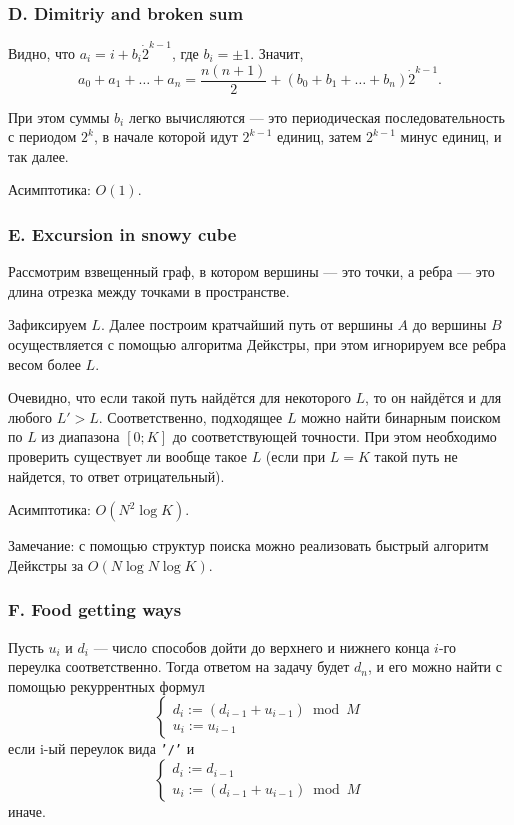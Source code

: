 \subsubsection*{D. Dimitriy and broken sum} 


Видно, что $a_i = i + b_i \dot 2^{k-1}$, где $b_i = \pm 1$. Значит,
$$ a_0 + a_1+ \dots + a_n = \frac{n(n + 1)}{2} + (b_0 + b_1 + \dots + b_n) \dot 2^{k-1}.$$

При этом суммы $b_i$ легко вычисляются --- это периодическая последовательность с периодом $2^k$, в начале которой идут $2^{k-1}$ единиц, затем $2^{k-1}$ минус единиц, и так далее.

Асимптотика: $O(1)$.



\subsubsection*{E. Excursion in snowy cube} 


Рассмотрим взвещенный граф, в котором вершины --- это точки, а ребра --- это длина отрезка между точками в
пространстве.

Зафиксируем $L$. Далее построим кратчайший путь от вершины $A$ до вершины $B$ осуществляется с помощью алгоритма Дейкстры, при этом игнорируем все ребра весом более $L$. 

Очевидно, что если такой путь найдётся для
некоторого $L$, то он найдётся и для любого $L' > L$. Соответственно, подходящее $L$ можно найти бинарным поиском по $L$ из диапазона $[0; K]$ до соответствующей точности. При этом необходимо проверить существует ли вообще такое $L$ (если при $L = K$ такой путь не найдется, то ответ отрицательный).

Асимптотика: $O(N^2 \log{K})$.

Замечание: с помощью структур поиска можно реализовать быстрый алгоритм Дейкстры за $O(N \log{N} \log{K})$.



\subsubsection*{F. Food getting ways} 


Пусть $u_i$ и $d_i$ --- число способов дойти
до верхнего и нижнего конца $i$-го переулка соответственно. Тогда ответом на задачу будет $d_n$, и его можно найти с помощью рекуррентных формул
$$
\begin{cases}
d_i := (d_{i-1} + u_{i-1}) \bmod M \\
u_i := u_{i-1}
\end{cases}
$$
если i-ый переулок вида {\tt ’/’} и
$$
\begin{cases}
d_i := d_{i-1}\\
u_i := (d_{i-1} + u_{i-1}) \bmod M
\end{cases}
$$
иначе.

